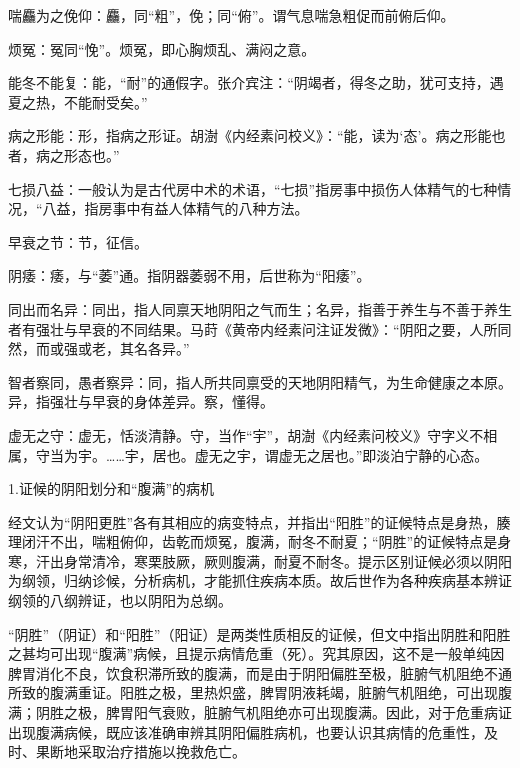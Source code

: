 \documentclass[12pt]{ctexbook}
\begin{document}

\begin{jiaozhu}
  \item 喘麤为之俛仰：麤，同“粗”，俛；同“俯”。谓气息喘急粗促而前俯后仰。
  \item 烦冤：冤同“悗”。烦冤，即心胸烦乱、满闷之意。
  \item 能冬不能复：能，“耐”的通假字。张介宾注：“阴竭者，得冬之助，犹可支持，遇夏之热，不能耐受矣。”
  \item 病之形能：形，指病之形证。胡澍《内经素问校义》：“能，读为‘态’。病之形能也者，病之形态也。”
  \item 七损八益：一般认为是古代房中术的术语，“七损”指房事中损伤人体精气的七种情况，“八益，指房事中有益人体精气的八种方法。
  \item 早衰之节：节，征信。
  \item 阴痿：痿，与“萎”通。指阴器萎弱不用，后世称为“阳痿”。
  \item 同出而名异：同出，指人同禀天地阴阳之气而生；名异，指善于养生与不善于养生者有强壮与早衰的不同结果。马莳《黄帝内经素问注证发微》：“阴阳之要，人所同然，而或强或老，其名各异。”
  \item 智者察同，愚者察异：同，指人所共同禀受的天地阴阳精气，为生命健康之本原。异，指强壮与早衰的身体差异。察，懂得。
  \item 虚无之守：虚无，恬淡清静。守，当作“宇”，胡澍《内经素问校义》守字义不相属，守当为宇。……宇，居也。虚无之宇，谓虚无之居也。”即淡泊宁静的心态。
\end{jiaozhu}


1.证候的阴阳划分和“腹满”的病机

经文认为“阴阳更胜”各有其相应的病变特点，并指出“阳胜”的证候特点是身热，腠理闭汗不出，喘粗俯仰，齿乾而烦冤，腹满，耐冬不耐夏；“阴胜”的证候特点是身寒，汗出身常清冷，寒栗肢厥，厥则腹满，耐夏不耐冬。提示区别证候必须以阴阳为纲领，归纳诊候，分析病机，才能抓住疾病本质。故后世作为各种疾病基本辨证纲领的八纲辨证，也以阴阳为总纲。

“阴胜”（阴证）和“阳胜”（阳证）是两类性质相反的证候，但文中指出阴胜和阳胜之甚均可出现“腹满”病候，且提示病情危重（死）。究其原因，这不是一般单纯因脾胃消化不良，饮食积滞所致的腹满，而是由于阴阳偏胜至极，脏腑气机阻绝不通所致的腹满重证。阳胜之极，里热炽盛，脾胃阴液耗竭，脏腑气机阻绝，可出现腹满；阴胜之极，脾胃阳气衰败，脏腑气机阻绝亦可出现腹满。因此，对于危重病证出现腹满病候，既应该准确审辨其阴阳偏胜病机，也要认识其病情的危重性，及时、果断地采取治疗措施以挽救危亡。
\end{document}

